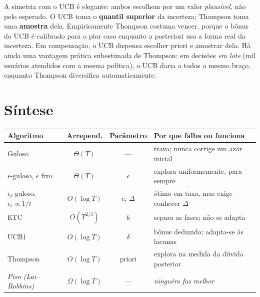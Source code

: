 \documentclass[11pt, a4paper]{article}
\newcommand{\gap}{\Delta}
\begin{document}
\begin{ideiabox}
A simetria com o UCB é elegante: ambos escolhem por um valor
\emph{plausível}, não pelo esperado. O UCB toma o \textbf{quantil superior}
da incerteza; Thompson toma uma \textbf{amostra} dela. Empiricamente
Thompson costuma vencer, porque o bônus do UCB é calibrado para o pior caso
enquanto a posteriori usa a forma real da incerteza. Em compensação, o UCB
dispensa escolher priori e amostrar dela. Há ainda uma vantagem prática
subestimada de Thompson: em decisões \emph{em lote} (mil usuários atendidos
com a mesma política), o UCB daria a todos o mesmo braço, enquanto Thompson
diversifica automaticamente.
\end{ideiabox}

\section{Síntese}

\begin{center}
\small
\begin{tabular}{lccl}
\toprule
\textbf{Algoritmo} & \textbf{Arrepend.} & \textbf{Parâmetro}
  & \textbf{Por que falha ou funciona} \\
\midrule
Guloso & $\Theta(T)$ & --- & trava; nunca corrige um azar inicial \\
$\epsilon$-guloso, $\epsilon$ fixo & $\Theta(T)$ & $\epsilon$
  & explora uniformemente, para sempre \\
$\epsilon_t$-guloso, $\epsilon_t \propto 1/t$ & $O(\log T)$ & $c,\ \gap$
  & ótimo em taxa, mas exige conhecer $\gap$ \\
ETC & $O(T^{2/3})$ & $k$ & separa as fases; não se adapta \\
UCB1 & $O(\log T)$ & $\delta$ & bônus deduzido; adapta-se às lacunas \\
Thompson & $O(\log T)$ & priori & explora na medida da dúvida posterior \\
\midrule
\emph{Piso (Lai--Robbins)} & $\Omega(\log T)$ & ---
  & \emph{ninguém faz melhor} \\
\bottomrule
\end{tabular}
\end{center}
\end{document}
